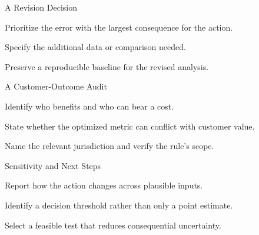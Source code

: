 \begin{frame}{A Revision Decision}
\vfill
\begin{slidebullets}
\item Prioritize the error with the largest consequence for the action.
\item Specify the additional data or comparison needed.
\item Preserve a reproducible baseline for the revised analysis.
\end{slidebullets}
\vfill
{}
\end{frame}
\begin{frame}{A Customer-Outcome Audit}
\vfill
\begin{slidebullets}
\item Identify who benefits and who can bear a cost.
\item State whether the optimized metric can conflict with customer value.
\item Name the relevant jurisdiction and verify the rule's scope.
\end{slidebullets}
\vfill
{}
\end{frame}
\begin{frame}{Sensitivity and Next Steps}
\vfill
\begin{slidebullets}
\item Report how the action changes across plausible inputs.
\item Identify a decision threshold rather than only a point estimate.
\item Select a feasible test that reduces consequential uncertainty.
\end{slidebullets}
\vfill
{}
\end{frame}

